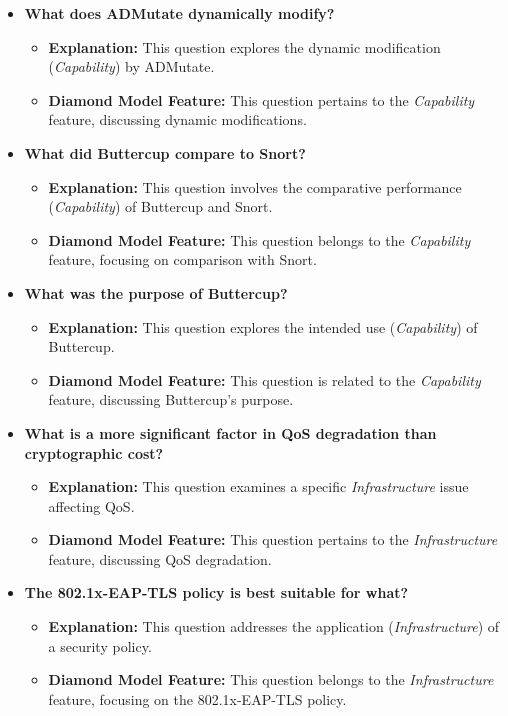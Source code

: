 \documentclass{article}
\begin{document}
\begin{itemize}
    \item \textbf{What does ADMutate dynamically modify?}
    \begin{itemize}
        \item \textbf{Explanation:} This question explores the dynamic modification (\textit{Capability}) by ADMutate.
        \item \textbf{Diamond Model Feature:} This question pertains to the \textit{Capability} feature, discussing dynamic modifications.
    \end{itemize}

    \item \textbf{What did Buttercup compare to Snort?}
    \begin{itemize}
        \item \textbf{Explanation:} This question involves the comparative performance (\textit{Capability}) of Buttercup and Snort.
        \item \textbf{Diamond Model Feature:} This question belongs to the \textit{Capability} feature, focusing on comparison with Snort.
    \end{itemize}

    \item \textbf{What was the purpose of Buttercup?}
    \begin{itemize}
        \item \textbf{Explanation:} This question explores the intended use (\textit{Capability}) of Buttercup.
        \item \textbf{Diamond Model Feature:} This question is related to the \textit{Capability} feature, discussing Buttercup's purpose.
    \end{itemize}

    \item \textbf{What is a more significant factor in QoS degradation than cryptographic cost?}
    \begin{itemize}
        \item \textbf{Explanation:} This question examines a specific \textit{Infrastructure} issue affecting QoS.
        \item \textbf{Diamond Model Feature:} This question pertains to the \textit{Infrastructure} feature, discussing QoS degradation.
    \end{itemize}

    \item \textbf{The 802.1x-EAP-TLS policy is best suitable for what?}
    \begin{itemize}
        \item \textbf{Explanation:} This question addresses the application (\textit{Infrastructure}) of a security policy.
        \item \textbf{Diamond Model Feature:} This question belongs to the \textit{Infrastructure} feature, focusing on the 802.1x-EAP-TLS policy.
    \end{itemize}
\end{itemize}
\end{document}
